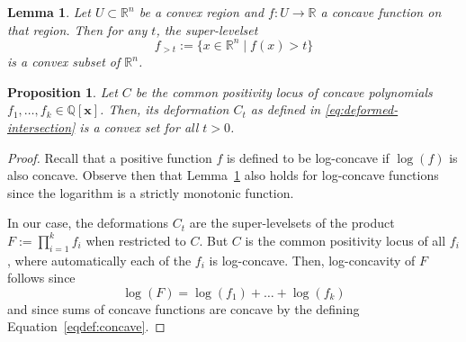 \documentclass[10pt,a4paper]{amsart}
\newtheorem{lemma}{Lemma}
\newtheorem{proposition}{Proposition}
\begin{document}
\begin{lemma}\label{lemma:superlevelsets}
    Let $U \subset \mathbb{R}^n$ be a convex region and $f: U \rightarrow \mathbb{R}$ a concave function on that region. Then for any $t$, the super-levelset
    \begin{equation}
        f_{>t} := \{x \in \mathbb{R}^n \mid f(x) > t\}
    \end{equation}
    is a convex subset of $\mathbb{R}^n$.
\end{lemma}

\begin{proposition}\label{prop:deformed-intersection}
    Let $C$ be the common positivity locus of concave polynomials $f_1,\ldots,f_k \in \mathbb{Q}[\mathbf x]$. Then,
    its deformation $C_t$ as defined in \eqref{eq:deformed-intersection} is a convex set for all $t>0$.
\end{proposition}

\begin{proof}
    Recall that a positive function $f$ is defined to be log-concave if $\log(f)$ is also concave. Observe then that Lemma~\ref{lemma:superlevelsets} also holds for log-concave functions since the logarithm is a strictly monotonic function.
    
    In our case, the deformations $C_t$ are the super-levelsets of the product $F:=\prod^k_{i=1} f_i$ when restricted to $C$. But $C$ is the common positivity locus of all $f_i$, where automatically each of the $f_i$ is log-concave.
    Then, log-concavity of $F$ follows since 
    \begin{equation*}
        \log(F) = \log(f_1) + \ldots + \log(f_k)
    \end{equation*}
    and since sums of concave functions are concave by the defining Equation~\eqref{eqdef:concave}.
\end{proof}
\end{document}
